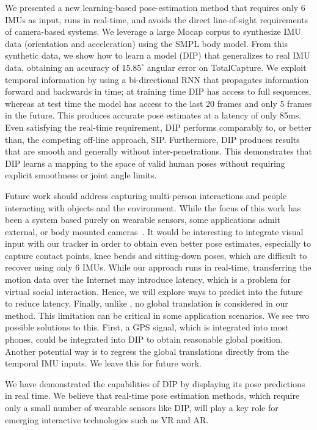 \documentclass[acmtog]{acmart}
\begin{document}
We presented a new learning-based pose-estimation method that requires only 6 IMUs as input, runs in real-time, and avoids the direct line-of-sight requirements of camera-based systems. We leverage a large Mocap corpus to synthesize IMU data (orientation and acceleration) using the SMPL body model. From this synthetic data, we show how to learn a  model (DIP) that generalizes to real IMU data, obtaining an accuracy of $15.85^\circ$ angular error on TotalCapture. We exploit temporal information by using a bi-directional RNN that propagates information forward and backwards in time; at training time DIP has access to full sequences, whereas at test time the model has access to the last 20 frames and only 5 frames in the future. This produces accurate pose estimates at a latency of only 85ms. Even satisfying the real-time requirement, DIP performs comparably to, or better than, the competing off-line approach, SIP. Furthermore, DIP produces results that are smooth and generally without inter-penetrations. This demonstrates that DIP learns a mapping to the space of valid human poses without requiring explicit smoothness or joint angle limits. 

Future work should address capturing multi-person interactions and people interacting with objects and the environment. While the focus of this work has been a system based purely on wearable sensors, some applications admit external, or body mounted cameras~\cite{rhodin2016egocap}. It would be interesting to integrate visual input with our tracker in order to obtain even better pose estimates, especially to capture contact points, knee bends and sitting-down poses, which are difficult to recover using only 6 IMUs. While our approach runs in real-time, transferring the motion data over the Internet may introduce latency, which is a problem for virtual social interaction. Hence, we will explore ways to predict into the future to reduce latency. Finally, unlike \cite{von2017sparse}, no global translation is considered in our method. This limitation can be critical in some application scenarios. We see two possible solutions to this. First, a GPS signal, which is integrated into most phones, could be integrated into DIP to obtain reasonable global position. Another potential way is to regress the global translations directly from the temporal IMU inputs. We leave this for future work.

We have demonstrated the capabilities of DIP by displaying its pose predictions in real time. We believe that real-time pose estimation methods, which require only a small number of wearable sensors like DIP, will play a key role for emerging interactive technologies such as VR and AR.
\end{document}
